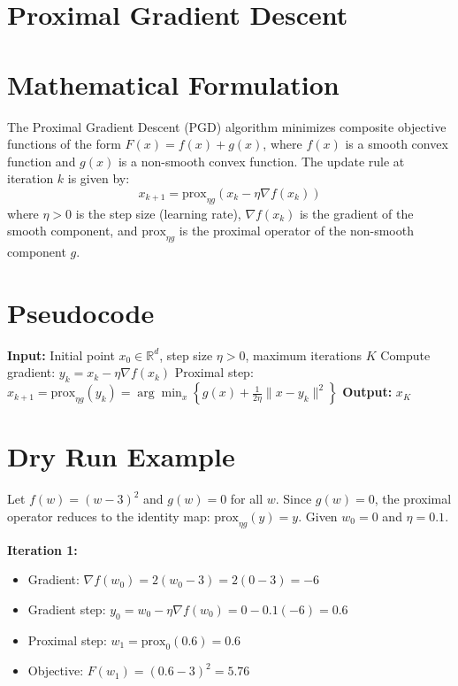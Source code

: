 \documentclass{article}
\begin{document}
\section*{Proximal Gradient Descent}

\section*{Mathematical Formulation}
The Proximal Gradient Descent (PGD) algorithm minimizes composite objective functions of the form $F(x) = f(x) + g(x)$, where $f(x)$ is a smooth convex function and $g(x)$ is a non-smooth convex function. The update rule at iteration $k$ is given by:
\begin{equation}
x_{k+1} = \text{prox}_{\eta g} \left( x_k - \eta \nabla f(x_k) \right)
\end{equation}
where $\eta > 0$ is the step size (learning rate), $\nabla f(x_k)$ is the gradient of the smooth component, and $\text{prox}_{\eta g}$ is the proximal operator of the non-smooth component $g$.

\section*{Pseudocode}
\begin{algorithm}[H]
\caption{Proximal Gradient Descent}
\begin{algorithmic}[1]
\State \textbf{Input:} Initial point $x_0 \in \mathbb{R}^d$, step size $\eta > 0$, maximum iterations $K$
    \State Compute gradient: $y_k = x_k - \eta \nabla f(x_k)$
    \State Proximal step: $x_{k+1} = \text{prox}_{\eta g}(y_k) = \arg\min_{x} \left\{ g(x) + \frac{1}{2\eta} \|x - y_k\|^2 \right\}$
\EndFor
\State \textbf{Output:} $x_K$
\end{algorithmic}
\end{algorithm}

\section*{Dry Run Example}
Let $f(w) = (w-3)^2$ and $g(w) = 0$ for all $w$. Since $g(w) = 0$, the proximal operator reduces to the identity map: $\text{prox}_{\eta g}(y) = y$. 
Given $w_0 = 0$ and $\eta = 0.1$.

\textbf{Iteration 1:}
\begin{itemize}
    \item Gradient: $\nabla f(w_0) = 2(w_0 - 3) = 2(0 - 3) = -6$
    \item Gradient step: $y_0 = w_0 - \eta \nabla f(w_0) = 0 - 0.1(-6) = 0.6$
    \item Proximal step: $w_1 = \text{prox}_{0}(0.6) = 0.6$
    \item Objective: $F(w_1) = (0.6 - 3)^2 = 5.76$
\end{itemize}
\end{document}
